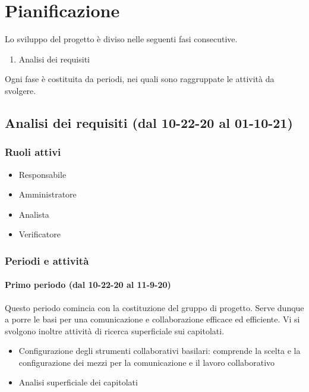 \section{Pianificazione}
Lo sviluppo del progetto è diviso nelle seguenti fasi consecutive.
\begin{enumerate}
	\item Analisi dei requisiti
\end{enumerate}
Ogni fase è costituita da periodi, nei quali sono raggruppate le attività da svolgere.

\subsection{Analisi dei requisiti (dal 10-22-20 al 01-10-21)}

\subsubsection{Ruoli attivi}
\begin{itemize}
	\item Responsabile
	\item Amministratore
	\item Analista
	\item Verificatore
\end{itemize}

\subsubsection{Periodi e attività}

\paragraph{Primo periodo (dal 10-22-20 al 11-9-20)}
Questo periodo comincia con la costituzione del gruppo di progetto. Serve dunque a porre le basi per una comunicazione e collaborazione efficace ed efficiente. Vi si svolgono inoltre attività di ricerca superficiale sui capitolati.

\begin{itemize}
	\item Configurazione degli strumenti collaborativi basilari: comprende la scelta e la configurazione dei mezzi per la comunicazione e il lavoro collaborativo
	\item Analisi superficiale dei capitolati
	
\end{itemize}

